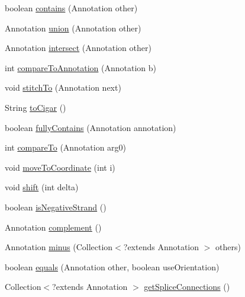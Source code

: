 \begin{DoxyCompactItemize}
boolean \hyperlink{classbroad_1_1core_1_1sequence_1_1_sequence_region_ad896c336b5e5144d7ddf11dd612a3093}{contains} (Annotation other)
\item 
Annotation \hyperlink{classbroad_1_1core_1_1sequence_1_1_sequence_region_a7a4740e9b0a66d03e0a38d5850be8257}{union} (Annotation other)
\item 
Annotation \hyperlink{classbroad_1_1core_1_1sequence_1_1_sequence_region_ae356921d62c2fa994e9db6984a4145a9}{intersect} (Annotation other)
\item 
int \hyperlink{classbroad_1_1core_1_1sequence_1_1_sequence_region_ac9f43edf121d64bc95040d941729c939}{compare\+To\+Annotation} (Annotation b)
\item 
void \hyperlink{classbroad_1_1core_1_1sequence_1_1_sequence_region_a58b4292580198f063b6f1e13e78e0c75}{stitch\+To} (Annotation next)
\item 
String \hyperlink{classbroad_1_1core_1_1sequence_1_1_sequence_region_a668292651b3b41242e038eddc0ebc753}{to\+Cigar} ()
\item 
boolean \hyperlink{classbroad_1_1core_1_1sequence_1_1_sequence_region_a22824c44e46c2d9349e8a5766b0236f1}{fully\+Contains} (Annotation annotation)
\item 
int \hyperlink{classbroad_1_1core_1_1sequence_1_1_sequence_region_a993ec505d2102da0412293340424b482}{compare\+To} (Annotation arg0)
\item 
void \hyperlink{classbroad_1_1core_1_1sequence_1_1_sequence_region_af53a0a8c5f18227b65363f16116a677b}{move\+To\+Coordinate} (int i)
\item 
void \hyperlink{classbroad_1_1core_1_1sequence_1_1_sequence_region_a5dc8df1d17984ba670c2b4bba52ca497}{shift} (int delta)
\item 
boolean \hyperlink{classbroad_1_1core_1_1sequence_1_1_sequence_region_a4a4fda6b7990a9d6f27679ae3a58a717}{is\+Negative\+Strand} ()
\item 
Annotation \hyperlink{classbroad_1_1core_1_1sequence_1_1_sequence_region_ac9aa1ca4eab54cf1f61c388b71baf63c}{complement} ()
\item 
Annotation \hyperlink{classbroad_1_1core_1_1sequence_1_1_sequence_region_ac95fe5b07675c3796fcdcd971c8cd3c6}{minus} (Collection$<$?extends Annotation $>$ others)
\item 
boolean \hyperlink{classbroad_1_1core_1_1sequence_1_1_sequence_region_ab42566c7079879d09e9a5332a6a9cc8d}{equals} (Annotation other, boolean use\+Orientation)
\item 
Collection$<$?extends Annotation $>$ \hyperlink{classbroad_1_1core_1_1sequence_1_1_sequence_region_ade05219b0093af953ff33e9a268b3224}{get\+Splice\+Connections} ()

\end{DoxyCompactItemize}
